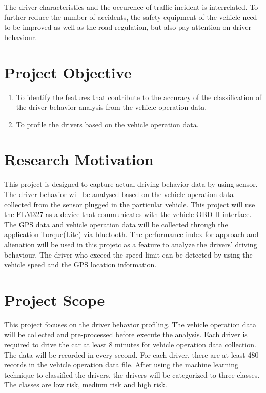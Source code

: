 The driver characteristics and the occurence of traffic incident is interrelated. To further reduce the number of accidents, the safety equipment of the vehicle need to be improved as well as the road regulation, but also pay attention on driver behaviour. 

\section{Project Objective}
\begin{enumerate}
\item To identify the features that contribute to the accuracy of the classification of the driver behavior analysis from the vehicle operation data.
\item To profile the drivers based on the vehicle operation data. 
\end{enumerate}

\section{Research Motivation}
This project is designed to capture actual driving behavior data by using sensor. The driver behavior will be analysed based on the vehicle operation data collected from the sensor plugged in the particular vehicle.  
This project will use the ELM327 as a device that communicates with the vehicle OBD-II interface. The GPS data and vehicle operation data will be collected through the application Torque(Lite) via bluetooth. 
The performance index for approach and alienation will be used in this projetc as a feature to analyze the drivers' driving behaviour. The driver who exceed the speed limit can be detected by using the vehicle speed and the GPS location information.

\section{Project Scope}
This project focuses on the driver behavior profiling. The vehicle operation data will be collected and pre-processed before execute the analysis. Each driver is required to drive the car at least 8 minutes for vehicle operation data collection. The data will be recorded in every second. For each driver, there are at least 480 records in the vehicle operation data file. After using the machine learning technique to classified the drivers, the drivers will be categorized to three classes. The classes are low risk, medium risk and high risk. 
 